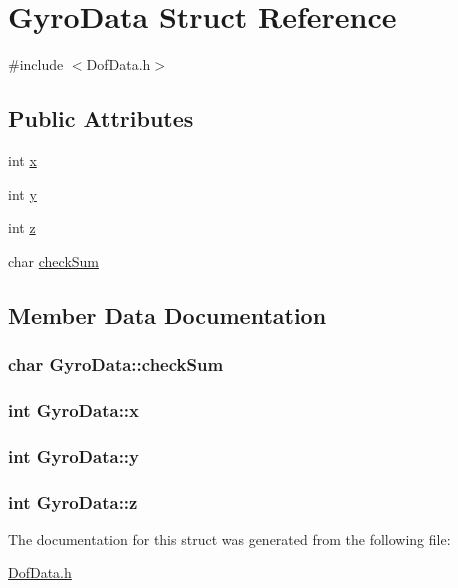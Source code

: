 \hypertarget{struct_gyro_data}{\section{Gyro\-Data Struct Reference}
\label{struct_gyro_data}
}


{\ttfamily \#include $<$Dof\-Data.\-h$>$}

\subsection*{Public Attributes}
\begin{DoxyCompactItemize}
\item 
int \hyperlink{struct_gyro_data_a3937e7a9de9f439521d40cc1d19e7669}{x}
\item 
int \hyperlink{struct_gyro_data_ae0cac61ea3a3afaede3c33dd674649fc}{y}
\item 
int \hyperlink{struct_gyro_data_a03375781942dd6051b0e0ddbd6c9988f}{z}
\item 
char \hyperlink{struct_gyro_data_a3fab5ca9b307929e2ce480128e1033f3}{check\-Sum}
\end{DoxyCompactItemize}


\subsection{Member Data Documentation}
\hypertarget{struct_gyro_data_a3fab5ca9b307929e2ce480128e1033f3}{
\subsubsection[{check\-Sum}]{\setlength{\rightskip}{0pt plus 5cm}char Gyro\-Data\-::check\-Sum}}\label{struct_gyro_data_a3fab5ca9b307929e2ce480128e1033f3}
\hypertarget{struct_gyro_data_a3937e7a9de9f439521d40cc1d19e7669}{
\subsubsection[{x}]{\setlength{\rightskip}{0pt plus 5cm}int Gyro\-Data\-::x}}\label{struct_gyro_data_a3937e7a9de9f439521d40cc1d19e7669}
\hypertarget{struct_gyro_data_ae0cac61ea3a3afaede3c33dd674649fc}{
\subsubsection[{y}]{\setlength{\rightskip}{0pt plus 5cm}int Gyro\-Data\-::y}}\label{struct_gyro_data_ae0cac61ea3a3afaede3c33dd674649fc}
\hypertarget{struct_gyro_data_a03375781942dd6051b0e0ddbd6c9988f}{
\subsubsection[{z}]{\setlength{\rightskip}{0pt plus 5cm}int Gyro\-Data\-::z}}\label{struct_gyro_data_a03375781942dd6051b0e0ddbd6c9988f}


The documentation for this struct was generated from the following file\-:\begin{DoxyCompactItemize}
\item 
\hyperlink{_dof_data_8h}{Dof\-Data.\-h}\end{DoxyCompactItemize}
